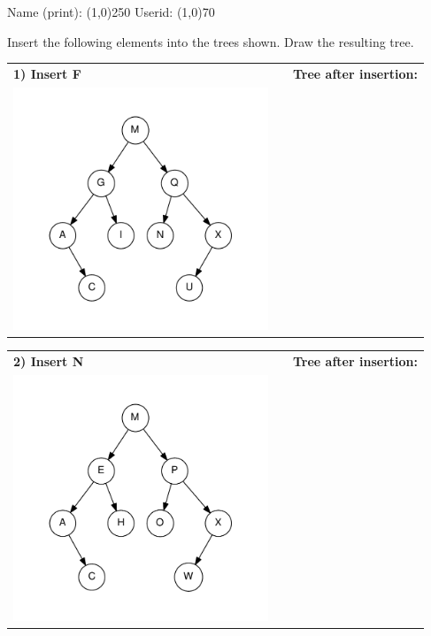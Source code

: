 \documentclass{article}
\begin{document}
\Large

\noindent Name (print): \line(1,0){250} \hspace{0.35in} Userid:
\line(1,0){70}

\vspace{0.25in}


\vspace{0.25in}

 Insert the following elements into the
trees shown.  Draw the resulting tree.

\vspace{0.25in}

\noindent\begin{tabular}{lcc}
\bf 1) Insert F & & \bf Tree after insertion: \\
\includegraphics[width=3in]{avl-tree-1} & \hspace{0.5in} & \\
\end{tabular}

\vspace{0.25in}

\noindent\begin{tabular}{lcc}
\bf 2) Insert N & & \bf Tree after insertion: \\
\includegraphics[width=3in]{avl-tree-2} & \hspace{0.5in} & \\
\end{tabular}
\end{document}
